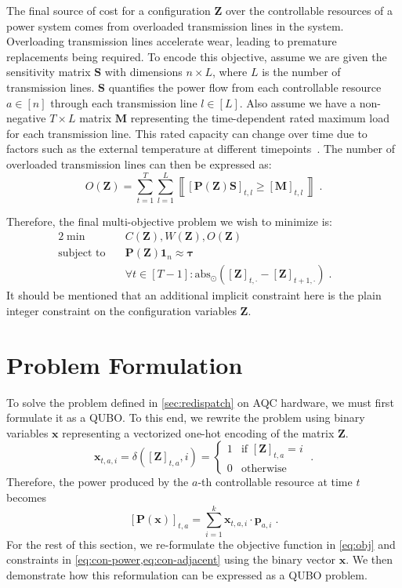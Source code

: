 \documentclass[conference]{IEEEtran}
\makeatletter
\newcommand{\bp}{\boldsymbol{p}}
\newcommand{\bP}{\boldsymbol{P}}
\newcommand{\bZ}{\boldsymbol{Z}}
\newcommand{\bS}{\boldsymbol{S}}
\newcommand{\bM}{\boldsymbol{M}}
\newcommand{\btau}{\boldsymbol{\tau}}
\newcommand{\ones}[1]{\boldsymbol{1}_{#1}}
\newcommand{\indices}[1]{[#1]}
\newcommand{\iverson}[1]{\left\llbracket #1\, \right\rrbracket}
\newcommand{\bx}{\boldsymbol{x}}
\newcommand{\g}[1]{#1}
\newcommand{\QUBO}{\textsc{QUBO}\@\xspace}
\makeatother
\begin{document}
The final source of cost for a configuration $\bZ$ over the controllable
resources of a power system comes from overloaded transmission lines in
the system. Overloading transmission lines accelerate wear, leading to
premature replacements being required.  To encode this objective, assume
we are given the sensitivity matrix $\bS$ with dimensions $n\times L$,
where $L$ is the number of transmission lines. $\bS$ quantifies the
power flow from each controllable resource $a\in\indices{n}$ through
each transmission line $l\in\indices{L}$. Also assume we have a
non-negative $T\times L$ matrix $\bM$ representing the time-dependent
rated maximum load for each transmission line. This rated capacity can
change over time due to factors such as the external temperature
at different timepoints~\cite{karimi2018}. The number of overloaded
transmission lines can then be expressed as:
\begin{equation}
  \label{eq:cost-overload}
  O(\bZ) = \sum_{t=1}^{T}\sum_{l=1}^{L}
  \iverson{[\bP(\bZ)\bS]_{t,l} \geq [\bM]_{t,l}}\;.
\end{equation}

Therefore, the final multi-objective problem we wish to minimize is:
\begin{alignat}{2}
  \min
  & \quad
    C(\g{\bZ}), W(\g{\bZ}), O(\bZ) && \label{eq:obj}\\
  \text{subject to}
  & \quad
    \g{\bP}(\g{\bZ}) \ones{n} \approx \btau&&
    \label{eq:con-power} \\
  &\quad
    \forall t\in\indices{T-1} :
  \text{abs}_{\odot}([\g{\bZ}]_{t,\cdot} - [\g{\bZ}]_{t+1,\cdot})\;. &&
      \label{eq:con-adjacent}
\end{alignat}
It should be mentioned that an additional implicit constraint here is
the plain integer constraint on the configuration variables $\bZ$.

\section{Problem Formulation}
\label{sec:naive}
To solve the problem defined in \cref{sec:redispatch} on AQC hardware, we
must first formulate it as a {\QUBO}. To this end, we rewrite the
problem using binary variables $\bx$ representing a vectorized one-hot
encoding of the matrix $\bZ$.
\begin{equation}
  \label{eq:one-hot-encoding}
  \bx_{t,a,i}
  = \delta( [\g{\bZ}]_{t,a}, i )
  =
  \begin{cases}
    1 & \text{if }[\bZ]_{t,a} = i\\
    0 & \text{otherwise}
  \end{cases}\;.
\end{equation}
Therefore, the power produced by the $a$-th controllable resource at
time $t$ becomes
\begin{equation}
  \label{eq:7}
  [\g{\bP}(\g{\bx})]_{t,a}=\sum_{i=1}^k
  \g{\bx}_{t,a,i}\cdot\g{\bp}_{a,i}\;.
\end{equation}
For the rest of this section, we re-formulate the objective function in
\cref{eq:obj} and constraints in \cref{eq:con-power,eq:con-adjacent}
using the binary vector $\bx$. We then demonstrate how this
reformulation can be expressed as a {\QUBO} problem.
\end{document}
